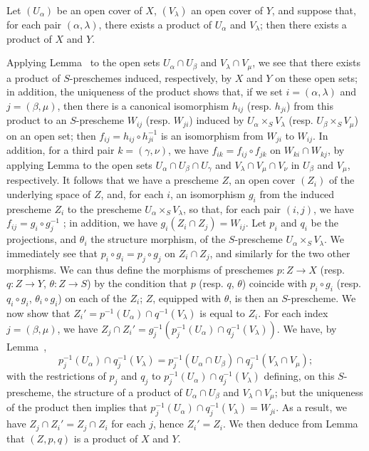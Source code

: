 \begin{lemma}[3.2.6.3]
\label{I.3.2.6.3}
Let $(U_\alpha)$ be an open cover of $X$, $(V_\lambda)$ an open cover of $Y$, and suppose
that, for each pair $(\alpha,\lambda)$, there exists a product of $U_\alpha$ and $V_\lambda$;
then there exists a product of $X$ and $Y$.
\end{lemma}

Applying Lemma~ to the open sets $U_\alpha\cap U_\beta$ and
$V_\lambda\cap V_\mu$, we see that there exists a product of $S$-preschemes induced,
respectively, by $X$ and $Y$ on these open sets; in addition, the uniqueness of the product
shows that, if we set $i=(\alpha,\lambda)$ and $j=(\beta,\mu)$, then there is a canonical
isomorphism $h_{ij}$ (resp. $h_{ji}$) from this product to an $S$-prescheme $W_{ij}$
(resp. $W_{ji}$) induced by $U_\alpha\times_S V_\lambda$ (resp. $U_\beta\times_S V_\mu$) on
an open set; then $f_{ij}=h_{ij}\circ h_{ji}^{-1}$ is an isomorphism from $W_{ji}$ to
$W_{ij}$. In addition, for a third pair $k=(\gamma,\nu)$, we have
$f_{ik}=f_{ij}\circ f_{jk}$ on
$W_{ki}\cap W_{kj}$, by applying Lemma  to
the open sets $U_\alpha\cap U_\beta\cap U_\gamma$ and $V_\lambda\cap V_\mu\cap V_\nu$ in
$U_\beta$ and $V_\mu$, respectively. It follows that we have a prescheme $Z$, an open cover
$(Z_i)$ of the underlying space of $Z$, and, for each $i$, an isomorphism $g_i$ from the
induced prescheme
$Z_i$ to the prescheme $U_\alpha\times_S V_\lambda$, so that, for each pair $(i,j)$, we have
$f_{ij}=g_i\circ g_j^{-1}$ ; in addition, we have $g_i(Z_i\cap Z_j)=W_{ij}$.
Let $p_i$ and $q_i$ be the projections, and $\theta_i$ the structure morphism, of the
$S$-prescheme $U_\alpha\times_S V_\lambda$. We immediately see that
$p_i\circ g_i=p_j\circ g_j$ on $Z_i\cap Z_j$, and similarly for the two other morphisms. We
can thus define the morphisms of preschemes $p:Z\to X$ (resp. $q:Z\to Y$, $\theta:Z\to S$) by
the condition that $p$ (resp. $q$, $\theta$) coincide with $p_i\circ g_i$
(resp. $q_i\circ g_i$, $\theta_i\circ g_i$) on each of the $Z_i$; $Z$, equipped with
$\theta$, is then an $S$-prescheme. We now show that
$Z_i'=p^{-1}(U_\alpha)\cap q^{-1}(V_\lambda)$ is equal to $Z_i$. For each index
$j=(\beta,\mu)$, we have $Z_j\cap Z_i'=g_j^{-1}(p_j^{-1}(U_\alpha)\cap q_j^{-1}(V_\lambda))$.
We have, by Lemma~,
\[
  p_j^{-1}(U_\alpha)\cap q_j^{-1}(V_\lambda)
  =p_j^{-1}(U_\alpha\cap U_\beta)\cap q_j^{-1}(V_\lambda\cap V_\mu);
\]
with the restrictions of $p_j$ and $q_j$ to
$p_j^{-1}(U_\alpha)\cap q_j^{-1}(V_\lambda)$ defining, on this $S$-prescheme, the structure of a
product of $U_\alpha\cap U_\beta$ and $V_\lambda\cap V_\mu$; but the uniqueness of the
product then implies that $p_j^{-1}(U_\alpha)\cap q_j^{-1}(V_\lambda)=W_{ji}$. As a result, we
have $Z_j\cap Z_i'=Z_j\cap Z_i$ for each $j$, hence $Z_i'=Z_i$. We then deduce from
Lemma~ that $(Z,p,q)$ is a product of $X$ and $Y$.

